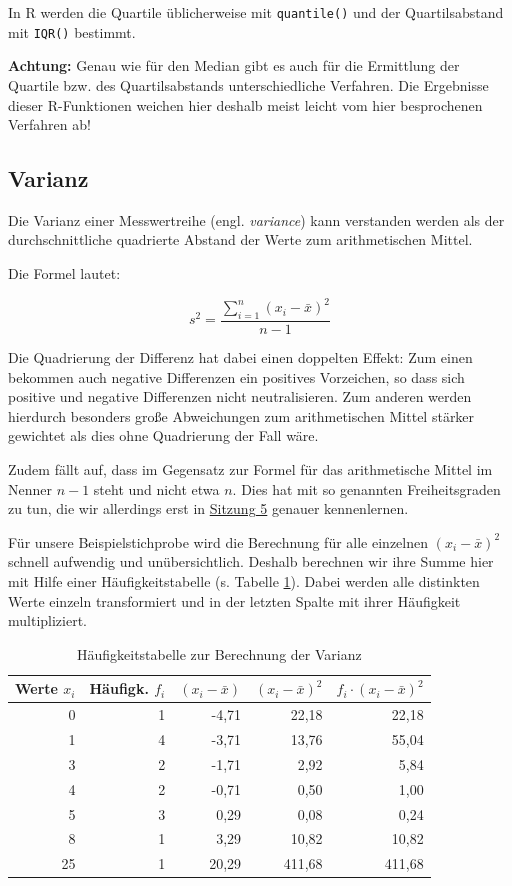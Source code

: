 \documentclass[
  11pt,
  ngerman,
  a4paper,
]{report}
\newenvironment{rtip}{
  \medskip
  \begin{tcolorbox}[colframe=purple,colback=light_gray,title=Softwarehinweis]
}{
  \end{tcolorbox}
  \medskip
}
\begin{document}
\begin{rtip}
In R werden die Quartile üblicherweise mit \verb|quantile()| und der Quartilsabstand mit \verb|IQR()| bestimmt.
\end{rtip}

\textbf{Achtung:} Genau wie für den Median gibt es auch für die Ermittlung der Quartile bzw. des Quartilsabstands unterschiedliche Verfahren. Die Ergebnisse dieser R-Funktionen weichen hier deshalb meist leicht vom hier besprochenen Verfahren ab!

\hypertarget{varianz}{%
\subsection{Varianz}\label{varianz}}

Die Varianz einer Messwertreihe (engl. \emph{variance}) kann verstanden werden als der durchschnittliche quadrierte Abstand der Werte zum arithmetischen Mittel.

Die Formel lautet:

\[
  s^2=\frac{\sum\limits_{i=1}^{n}(x_{i}-\bar{x})^2}{n-1}
  \label{eq:var}
\]

Die Quadrierung der Differenz hat dabei einen doppelten Effekt: Zum einen bekommen auch negative Differenzen ein positives Vorzeichen, so dass sich positive und negative Differenzen nicht neutralisieren. Zum anderen werden hierdurch besonders große Abweichungen zum arithmetischen Mittel stärker gewichtet als dies ohne Quadrierung der Fall wäre.

Zudem fällt auf, dass im Gegensatz zur Formel für das arithmetische Mittel im Nenner \(n-1\) steht und nicht etwa \(n\). Dies hat mit so genannten Freiheitsgraden zu tun, die wir allerdings erst in \protect\hyperlink{freiheitsgrade}{Sitzung 5} genauer kennenlernen.

Für unsere Beispielstichprobe wird die Berechnung für alle einzelnen \((x_i-\bar{x})^2\) schnell aufwendig und unübersichtlich. Deshalb berechnen wir ihre Summe hier mit Hilfe einer Häufigkeitstabelle (s. Tabelle \ref{tab:freq}). Dabei werden alle distinkten Werte einzeln transformiert und in der letzten Spalte mit ihrer Häufigkeit multipliziert.

\begin{table}

\caption{\label{tab:freq}Häufigkeitstabelle zur Berechnung der Varianz}
\centering
\begin{tabular}[t]{rrrrr}
\toprule
Werte $x_i$ & Häufigk. $f_i$ & $(x_i- \bar{x})$ & $(x_i- \bar{x})^2$ & $f_i\cdot(x_i -\bar{x})^2$\\
\midrule
0 & 1 & -4,71 & 22,18 & 22,18\\
1 & 4 & -3,71 & 13,76 & 55,04\\
3 & 2 & -1,71 & 2,92 & 5,84\\
4 & 2 & -0,71 & 0,50 & 1,00\\
5 & 3 & 0,29 & 0,08 & 0,24\\
8 & 1 & 3,29 & 10,82 & 10,82\\
25 & 1 & 20,29 & 411,68 & 411,68\\
\bottomrule
\end{tabular}
\end{table}
\end{document}
